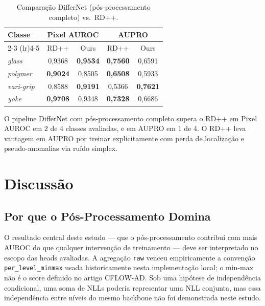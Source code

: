 \documentclass[conference]{IEEEtran}
\begin{document}
\begin{table}[htb]
\centering
\caption{Comparação DifferNet (pós-processamento completo) vs.\ RD++.}
\label{tab:vs_rdpp}
\begin{tabular}{@{}lcccc@{}}
\toprule
Classe & \multicolumn{2}{c}{Pixel AUROC} & \multicolumn{2}{c}{AUPRO} \\
\cmidrule(lr){2-3} \cmidrule(lr){4-5}
 & RD++ & Ours & RD++ & Ours \\
\midrule
\textit{glass}   & 0,9368 & \textbf{0,9534} & \textbf{0,7560} & 0,6591 \\
\textit{polymer} & \textbf{0,9024} & 0,8505 & \textbf{0,6508} & 0,5933 \\
\textit{vari-grip} & 0,8588 & \textbf{0,9191} & 0,5366 & \textbf{0,7621} \\
\textit{yoke}    & \textbf{0,9708} & 0,9348 & \textbf{0,7328} & 0,6686 \\
\bottomrule
\end{tabular}
\end{table}

O pipeline DifferNet com pós-processamento completo supera o RD++ em Pixel AUROC em 2 de 4 classes avaliadas, e em AUPRO em 1 de 4. O RD++ leva vantagem em AUPRO por treinar explicitamente com perda de localização e pseudo-anomalias via ruído simplex.

\section{Discussão}
\label{sec:discussion}

\subsection{Por que o Pós-Processamento Domina}

O resultado central deste estudo --- que o pós-processamento contribui com mais AUROC do que qualquer intervenção de treinamento --- deve ser interpretado no escopo das heads avaliadas. A agregação \texttt{raw} venceu empiricamente a convenção \texttt{per\_level\_minmax} usada historicamente nesta implementação local; o min-max não é o score definido no artigo CFLOW-AD. Sob uma hipótese de independência condicional, uma soma de NLLs poderia representar uma NLL conjunta, mas essa independência entre níveis do mesmo backbone não foi demonstrada neste estudo.
\end{document}
